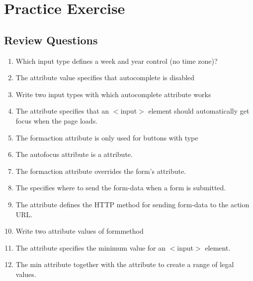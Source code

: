 \documentclass[11pt,a4paper]{article}
\begin{document}
\section*{Practice Exercise}
\subsection*{Review Questions}
\begin{enumerate}\itemsep10pt
\item Which input type defines a week and year control (no time zone)? \underline{\hspace{3cm}}
\item The \underline{\hspace{2cm}} attribute value specifies that autocomplete is disabled 
\item Write two input types with which autocomplete attribute works \underline{\hspace{3cm}}
\item The \underline{\hspace{2cm}}  attribute specifies that an $<$input$>$ element should automatically get focus when the page loads.
\item The formaction attribute is only used for buttons with type \underline{\hspace{2cm}}
\item The autofocus attribute is a \underline{\hspace{2cm}} attribute.
\item The formaction attribute overrides the form's \underline{\hspace{2cm}} attribute.
\item The \underline{\hspace{2cm}} specifies where to send the form-data when a form is submitted.
\item The \underline{\hspace{2cm}} attribute defines the HTTP method for sending form-data to the action URL.
\item Write two attribute values of formmethod \underline{\hspace{3cm}}
\item The \underline{\hspace{2cm}} attribute specifies the minimum value for an $<$input$>$ element.
\item The min attribute together with the \underline{\hspace{2cm}} attribute to create a range of legal values.

\end{enumerate}
\end{document}
